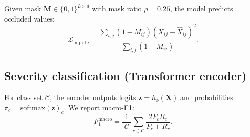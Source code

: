 Given mask $\mathbf{M}\in\{0,1\}^{L\times d}$ with mask ratio $\rho=0.25$, the model predicts occluded values:
\begin{equation}
\label{eq:saits_loss}
\mathcal{L}_{\mathrm{impute}} = \frac{\sum_{i,j}(1-M_{ij})(X_{ij}-\hat{X}_{ij})^2}{\sum_{i,j}(1-M_{ij})}.
\end{equation}

\subsection{Severity classification (Transformer encoder)}

For class set $\mathcal{C}$, the encoder outputs logits $\mathbf{z}=h_\phi(\mathbf{X})$ and probabilities $\pi_c=\mathrm{softmax}(\mathbf{z})_c$. We report macro-F1:
\begin{equation}
\label{eq:macro_f1}
F_1^{\mathrm{macro}} = \frac{1}{|\mathcal{C}|}\sum_{c\in\mathcal{C}}\frac{2P_c R_c}{P_c+R_c}.
\end{equation}
